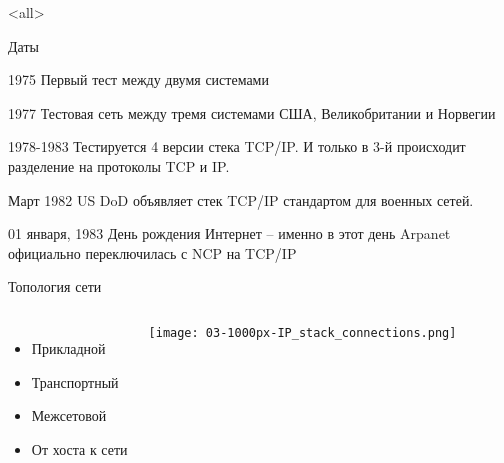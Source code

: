 

\subtitle[TCP/IP]{Стек протоколов TCP/IP}



\mode<all>{}

%
%

\begin{frame}{Даты}
	\tiny
	\begin{block}{1975}
	Первый тест между двумя системами
	\end{block}
	\pause
	\begin{block}{1977}
	Тестовая сеть между тремя системами США, Великобритании и Норвегии
	\end{block}
	\pause
	\begin{block}{1978-1983}
	Тестируется 4 версии стека TCP/IP. И только в 3-й происходит разделение на протоколы TCP и IP.
	\end{block}
	\pause
	\begin{block}{Март 1982}
	US DoD объявляет стек TCP/IP стандартом для военных сетей.
	\end{block}
	\pause
	\begin{block}{01 января,  1983}
	День рождения Интернет -- именно в этот день Arpanet официально переключилась с NCP на TCP/IP 
	\end{block}
\end{frame}


\begin{frame}{Топология сети}
	\begin{columns}
	\vspace{5em}
	\begin{itemize}
		\item Прикладной
		\item Транспортный
		\item Межсетовой
		\item От хоста к сети
	\end{itemize}

	\begin{center}
		\texttt{[image: 03-1000px-IP\_stack\_connections.png]}
	\end{center}
	\end{columns}
\end{frame}

